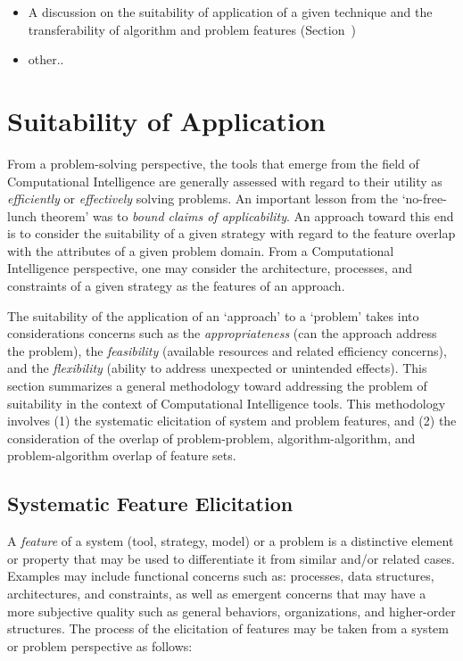 \documentclass[a4paper, 11pt]{article}
\begin{document}
\begin{itemize} 
  \item A discussion on the suitability of application of a given technique and the transferability of algorithm and problem features (Section~\cite{sec:suitability})
  \item other..
\end{itemize}

%
%
\section{Suitability of Application}
\label{sec:suitability}
From a problem-solving perspective, the tools that emerge from the field of Computational Intelligence are generally assessed with regard to their utility as \emph{efficiently} or \emph{effectively} solving problems.
An important lesson from the `no-free-lunch theorem' was to \emph{bound claims of applicability}. An approach toward this end is to consider the suitability of a given strategy with regard to the feature overlap with the attributes of a given problem domain. From a Computational Intelligence perspective, one may consider the architecture, processes, and constraints of a given strategy as the features of an approach. 

The suitability of the application of an `approach' to a `problem' takes into considerations concerns such as the \emph{appropriateness} (can the approach address the problem), the \emph{feasibility} (available resources and related efficiency concerns), and the \emph{flexibility} (ability to address unexpected or unintended effects).
This section summarizes a general methodology toward addressing the problem of suitability in the context of Computational Intelligence tools. This methodology involves (1) the systematic elicitation of system and problem features, and (2) the consideration of the overlap of problem-problem, algorithm-algorithm, and problem-algorithm overlap of feature sets. 

\subsection{Systematic Feature Elicitation}
A \emph{feature} of a system (tool, strategy, model) or a problem is a distinctive element or property that may be used to differentiate it from similar and/or related cases. Examples may include functional concerns such as: processes, data structures, architectures, and constraints, as well as emergent concerns that may have a more subjective quality such as general behaviors, organizations, and higher-order structures. The process of the elicitation of features may be taken from a system or problem perspective as follows:
\end{document}
